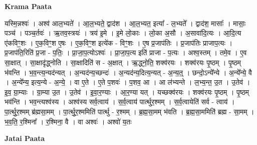 \documentclass[17pt]{extarticle}
\begin{document}
\textbf{Krama Paata} \newline

यस्मि॒न्नश्वः॑ । अश्व॑ आल॒भ्यते॑ । आ॒ल॒भ्यते॒ द्वाद॑श । आ॒ल॒भ्यत॒ इत्या᳚ - ल॒भ्यते᳚ । द्वाद॑श॒ मासाः᳚ । मासाः॒ पञ्च॑ । पञ्च॒र्तवः॑ । ऋ॒तव॒स्त्रयः॑ । त्रय॑ इ॒मे । इ॒मे लो॒काः । लो॒का अ॒सौ । अ॒सावा॑दि॒त्यः । आ॒दि॒त्य ए॑कविꣳ॒॒शः । ए॒क॒विꣳ॒॒श ए॒षः । ए॒क॒विꣳ॒॒श इत्ये॑क - विꣳ॒॒शः । ए॒ष प्र॒जाप॑तिः । प्र॒जाप॑तिः प्राजाप॒त्यः । प्र॒जाप॑ति॒रिति॑ प्र॒जा - प॒तिः॒ । प्रा॒जा॒प॒त्योऽश्वः॑ । प्रा॒जा॒प॒त्य इति॑ प्राजा - प॒त्यः । अश्व॒स्तम् । तमे॒व । ए॒व सा॒क्षात् । सा॒क्षादृ॑द्ध्नोति । सा॒क्षादिति॑ स - अ॒क्षात् । ऋ॒द्ध्नो॒ति॒ शक्व॑रयः । शक्व॑रयः पृ॒ष्ठम् । पृ॒ष्ठम् भ॑वन्ति । भ॒व॒न्त्य॒न्यद॑न्यत् । अ॒न्यद॑न्य॒च्छन्दः॑ । अ॒न्यद॑न्य॒दित्य॒न्यत् - अ॒न्य॒त्॒ । छन्दो॒ऽन्ये᳚न्ये । अ॒न्ये᳚न्ये॒ वै । अ॒न्ये᳚न्य॒ इत्य॒न्ये - अ॒न्ये॒ । वा ए॒ते । ए॒ते प॒शवः॑ । प॒शव॒ आ । आ ल॑भ्यन्ते । ल॒भ्य॒न्त॒ उ॒त । उ॒तेव॑ । इ॒व॒ ग्रा॒म्याः । ग्रा॒म्या उ॒त । उ॒तेव॑ । इ॒वा॒र॒ण्याः । आ॒र॒ण्या यत् । यच्छक्व॑रयः । शक्व॑रयः पृ॒ष्ठम् । पृ॒ष्ठम् भव॑न्ति । भव॒न्त्यश्व॑स्य । अश्व॑स्य सर्व॒त्वाय॑ । स॒र्व॒त्वाय॑ पार्त्थुर॒श्मम् । स॒र्व॒त्वायेति॑ सर्व - त्वाय॑ । पा॒र्त्थु॒र॒श्मम् ब्र॑ह्मसा॒मम् । पा॒र्त्थु॒र॒श्ममिति॑ पार्त्थु - र॒श्मम् । ब्र॒ह्म॒सा॒मम् भ॑वति । ब्र॒ह्म॒सा॒ममिति॑ ब्रह्म - सा॒मम् । भ॒व॒ति॒ र॒श्मिना᳚ । र॒श्मिना॒ वै । वा अश्वः॑ । अश्वो॑ य॒तः \newline

\textbf{Jatai Paata} \newline
\end{document}
